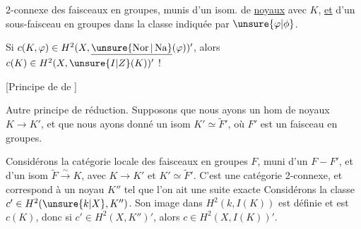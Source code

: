 2-connexe des faisceaux en groupes, munis d'un isom. de \uline{noyaux} avec $K$, \uline{et} d'un sous-faisceau en groupes dans la classe indiquée par $\unsure{\varphi|\phi}$.

Si $c(K,\varphi)\in H^2(X,\underline{\unsure{\operatorname{Nor}|\operatorname{Na}}}(\varphi))'$, alors $c(K)\in H^2(X,\unsure{I|Z}(K))'$ !

[Principe de  de ]

Autre principe de réduction. Supposons que nous ayons un hom  de noyaux $K\longrightarrow K'$, et que nous ayons donné un isom $K'\simeq\widetilde{F}'$, où $F'$ est un faisceau en groupes.

 Considérons la catégorie locale des faisceaux en groupes $F$, muni d'un  $F-F'$, et d'un isom $\widetilde{F}\xrightarrow{\sim}K$,  avec $K\longrightarrow K'$ et $K'\simeq\widetilde{F}'$. C'est une catégorie 2-connexe, et correspond à un noyau $K''$ tel que l'on ait une suite exacte
 Considérons la classe $c'\in H^2(\unsure{k|X},K'')$. Son image dans  $H^2(k,I(K))$ est définie et est $c(K)$, donc si $c'\in H^2(X,K'')'$, alors $c\in H^2(X,I(K))'$.

